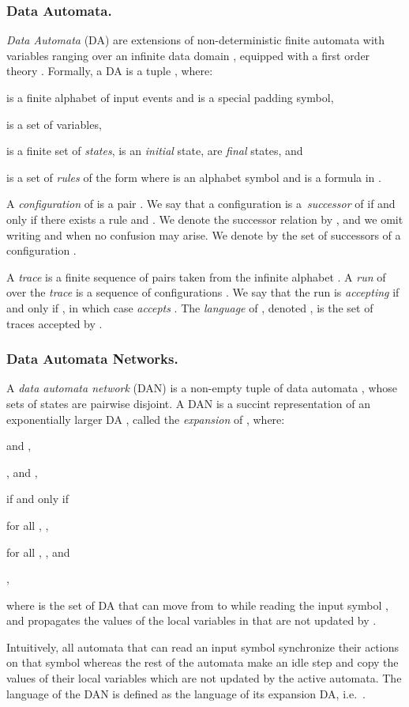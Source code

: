 \documentclass{llncs}
\begin{document}
\subsubsection{Data Automata.}


\emph{Data Automata} (DA) are extensions of non-deterministic finite
automata with variables ranging over an infinite data domain
, equipped with a first order theory . Formally, a
DA is a tuple , where:
\begin{compactitem}
\item  is a finite alphabet of input events and  is a special padding symbol,
\item  is a set of variables,
\item  is a finite set of {\em states},  is an
  \emph{initial} state,  are {\em final} states, and
\item  is a set of {\em rules} of the form  where 
  is an alphabet symbol and  is a formula in
  .
\end{compactitem}
A \emph{configuration} of  is a pair . We say that a configuration  is 
a~\emph{successor} of  if and only if there exists a rule  and . We denote the successor relation by , and we omit writing  and 
when no confusion may arise. We denote by 
 the set of successors of a configuration .

A \emph{trace} is a finite sequence  of pairs 
taken from the infinite alphabet . A \emph{run} of  over the \emph{trace}  is a sequence
of configurations . We say
that the run  is \emph{accepting} if and only if , in
which case  \emph{accepts} . The \emph{language} of , denoted
, is the set of traces accepted by .

\subsubsection{Data Automata Networks.}


A \emph{data automata network} (DAN) is a non-empty tuple  of data automata ,
 whose sets of states are pairwise disjoint. A DAN is a
succint representation of an exponentially larger DA
, called the \emph{expansion}
of , where:
\begin{compactitem}
\item  and
  ,
\item ,  and , 
\item  if and only if \begin{inparaenum}[(i)] \item for all , , \item for all , ,
  and \item , 
\end{inparaenum} where  is the set of DA that can move from  to
 while reading the input symbol , and  propagates the values of the local variables
in  that are not updated by .
\end{compactitem} 
Intuitively, all automata that can read an input symbol synchronize
their actions on that symbol whereas the rest of the automata make an
idle step and copy the values of their local variables which are not
updated by the active automata. The language of the DAN 
is defined as the language of its expansion DA,
i.e.\ .
\end{document}
